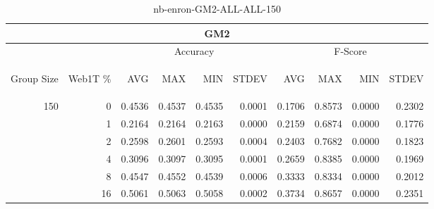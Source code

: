 \begin{center}
\begin{table}[htbp] 
 \begin{center}
\begin{tabular}{ | r | r | r | r | r | r | r | r | r | r |}
\hline
\multicolumn{10}{|c|}{GM2}\\
\hline
 & & \multicolumn{4}{|c|}{Accuracy} & \multicolumn{4}{|c|}{F-Score}\\ \cline{3-10}
\begin{sideways}Group Size\end{sideways} & \begin{sideways}Web1T \%\end{sideways} & \begin{sideways}AVG\end{sideways} & \begin{sideways}MAX\end{sideways} & \begin{sideways}MIN\end{sideways} & \begin{sideways}STDEV\end{sideways} & \begin{sideways}AVG\end{sideways} & \begin{sideways}MAX\end{sideways} & \begin{sideways}MIN\end{sideways} & \begin{sideways}STDEV\end{sideways}\\
\hline
\multirow{5}{*}{150}
 & 0 & 0.4536 & 0.4537 & 0.4535 & 0.0001 & 0.1706 & 0.8573 & 0.0000 & 0.2302\\ \cline{2-10}
 & 1 & 0.2164 & 0.2164 & 0.2163 & 0.0000 & 0.2159 & 0.6874 & 0.0000 & 0.1776\\ \cline{2-10}
 & 2 & 0.2598 & 0.2601 & 0.2593 & 0.0004 & 0.2403 & 0.7682 & 0.0000 & 0.1823\\ \cline{2-10}
 & 4 & 0.3096 & 0.3097 & 0.3095 & 0.0001 & 0.2659 & 0.8385 & 0.0000 & 0.1969\\ \cline{2-10}
 & 8 & 0.4547 & 0.4552 & 0.4539 & 0.0006 & 0.3333 & 0.8334 & 0.0000 & 0.2012\\ \cline{2-10}
 & 16 & 0.5061 & 0.5063 & 0.5058 & 0.0002 & 0.3734 & 0.8657 & 0.0000 & 0.2351\\ \cline{2-10}
\hline
\end{tabular}
\caption{nb-enron-GM2-ALL-ALL-150}
\label{table:nb-enron-GM2-ALL-ALL-150}
\end{center}
 \end{table}
\end{center}

